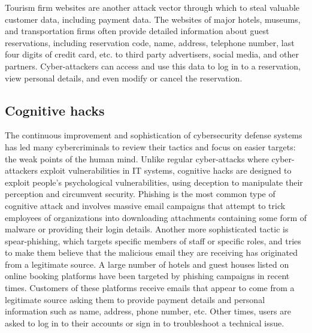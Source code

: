 \documentclass[
  letterpaper,
  DIV=11,
  numbers=noendperiod]{scrreprt}
\begin{document}
Tourism firm websites are another attack vector through which to steal
valuable customer data, including payment data. The websites of major
hotels, museums, and transportation firms often provide detailed
information about guest reservations, including reservation code, name,
address, telephone number, last four digits of credit card, etc. to
third party advertisers, social media, and other partners.
Cyber-attackers can access and use this data to log in to a reservation,
view personal details, and even modify or cancel the reservation.

\hypertarget{cognitive-hacks}{%
\subsection{Cognitive hacks}\label{cognitive-hacks}}

The continuous improvement and sophistication of cybersecurity defense
systems has led many cybercriminals to review their tactics and focus on
easier targets: the weak points of the human mind. Unlike regular
cyber-attacks where cyber-attackers exploit vulnerabilities in IT
systems, cognitive hacks are designed to exploit people's psychological
vulnerabilities, using deception to manipulate their perception and
circumvent security. Phishing is the most common type of cognitive
attack and involves massive email campaigns that attempt to trick
employees of organizations into downloading attachments containing some
form of malware or providing their login details. Another more
sophisticated tactic is spear-phishing, which targets specific members
of staff or specific roles, and tries to make them believe that the
malicious email they are receiving has originated from a legitimate
source. A large number of hotels and guest houses listed on online
booking platforms have been targeted by phishing campaigns in recent
times. Customers of these platforms receive emails that appear to come
from a legitimate source asking them to provide payment details and
personal information such as name, address, phone number, etc. Other
times, users are asked to log in to their accounts or sign in to
troubleshoot a technical issue.
\end{document}
